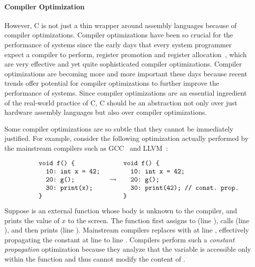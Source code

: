 \paragraph{Compiler Optimization}

However, C is not just a thin wrapper around assembly languages because of compiler optimizations.
Compiler optimizations have been so crucial for the performance of systems since the early days that
every system programmer expect a compiler to perform, \eg{} register promotion and register
allocation~\cite{reg-prom, reg-alloc}, which are very effective and yet quite sophisticated compiler
optimizations.  Compiler optimizations are becoming more and more important these days because
recent trends offer potential for compiler optimizations to further improve the performance of
systems.  Since compiler optimizations are an essential ingredient of the real-world practice of C,
C should be an abstraction not only over just hardware assembly languages but also over compiler
optimizations.



Some compiler optimizations are so subtle that they cannot be immediately justified.  For example,
consider the following optimization actually performed by the mainstream compilers such as
GCC~\cite{gcc} and LLVM~\cite{llvm}:

\[\begin{array}{rcl}
\begin{minipage}{0.27\textwidth}
\begin{verbatim}
void f() {
  10: int x = 42;
  20: g();
  30: print(x);
}
\end{verbatim}
\end{minipage}
&
\optarrow
&
\begin{minipage}{0.4\textwidth}
\begin{verbatim}
void f() {
  10: int x = 42;
  20: g();
  30: print(42); // const. prop.
}
\end{verbatim}
\end{minipage}
\end{array}\]

\noindent Suppose  is an external function whose body is unknown to the compiler, and
 prints the value of $x$ to the screen.  The function  first assigns
 to  (line ), calls  (line ), and then prints 
(line ).  Mainstream compilers replaces  with  at line ,
effectively propagating the constant  at line  to line .  Compilers
perform such a \emph{constant propagation} optimization because they analyze that the variable
 is accessible only within the function  and thus  cannot modify the
content of .

